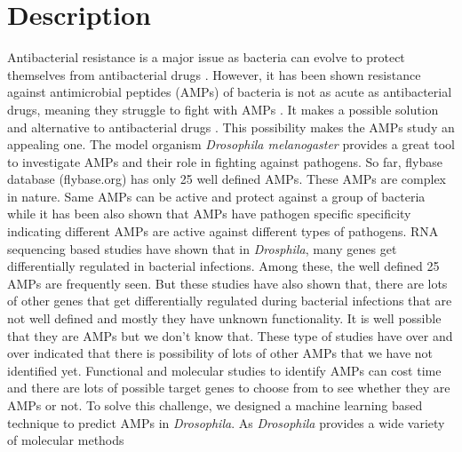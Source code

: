 \documentclass[letterpaper,11pt]{article}
\begin{document}
\section{Description}
Antibacterial resistance is a major issue as bacteria can evolve to protect themselves from antibacterial drugs \cite{levy2004antibacterial}. However, it has been shown resistance against antimicrobial peptides (AMPs) of bacteria is not as acute as antibacterial drugs, meaning they struggle to fight with AMPs \cite{xuan2023antimicrobial}. It makes a possible solution and alternative to antibacterial drugs \cite{hardie2007amp}. This possibility makes the AMPs study an appealing one. The model organism \textit{Drosophila melanogaster} provides a great tool to investigate AMPs and their role in fighting against pathogens. So far, flybase database (flybase.org) has only 25 well defined AMPs. These AMPs are complex in nature. Same AMPs can be active and protect against a group of bacteria while it has been also shown that AMPs have pathogen specific specificity indicating different AMPs are active against different types of pathogens. RNA sequencing based studies have shown that in \textit{Drosphila}, many genes get differentially regulated in bacterial infections. Among these, the well defined 25 AMPs are frequently seen. But these studies have also shown that, there are lots of other genes that get differentially regulated during bacterial infections that are not well defined and mostly they have unknown functionality. It is well possible that they are AMPs but we don't know that. These type of studies have over and over indicated that there is possibility of lots of other AMPs that we have not identified yet. Functional and molecular studies to identify AMPs can cost time and there are lots of possible target genes to choose from to see whether they are AMPs or not. To solve this challenge, we designed a machine learning based technique to predict AMPs in \textit{Drosophila}. As \textit{Drosophila} provides a wide variety of molecular methods
\end{document}
